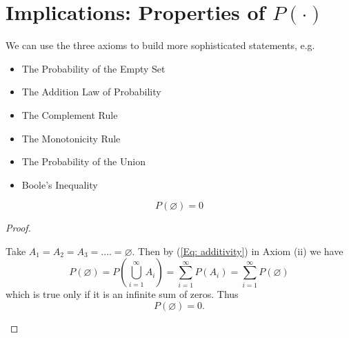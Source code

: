 \documentclass[notes=show,handout]{beamer}\usepackage[]{graphicx}\usepackage[]{color}
\begin{document}
\section{Implications: Properties of $P(\cdot)$}

\begin{frame}{\secname}
  We can use the three axioms to build more sophisticated statements, e.g.
  \bigskip
  \begin{itemize}
  \item The Probability of the Empty Set
  \item The Addition Law of Probability
  \item The Complement Rule
  \item The Monotonicity Rule
  \item The Probability of the Union
  \item Boole's Inequality
  \end{itemize}
\end{frame}

\begin{frame}{\secname}
  \begin{theorem}
  $$P(\varnothing)=0$$
  \end{theorem}
  \pause
  \begin{proof}
  \begin{footnotesize}
  Take $A_1=A_2=A_3=....=\varnothing$. Then by (\ref{Eq: additivity}) in Axiom (ii) we have
  $$
  P(\varnothing)= P\left(  \bigcup_{i=1}^{\infty} A_i \right)
  = \sum_{i=1}^{\infty} P(A_i)
  =\sum_{i=1}^{\infty} P(\varnothing)
  $$
  which is true only if it is an infinite sum of zeros. Thus
  $$
  P(\varnothing) =  0.
  $$
  \end{footnotesize}
  \end{proof}
\end{frame}
\end{document}
